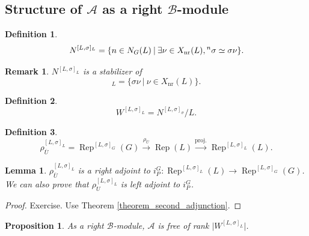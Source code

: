 \documentclass[8pt]{article}
\newtheorem{proposition}{Proposition}[section]
\newtheorem{definition}{Definition}[section]
\newtheorem{lemma}{Lemma}[section]
\newtheorem{remark}{Remark}[section]
\DeclareMathOperator{\Rep}{Rep}
\DeclareMathOperator{\nr}{nr}
\newcommand{\sep}[0]{\:|\:}
\newcommand{\cA}{\mathcal{A}}
\newcommand{\cB}{\mathcal{B}}
\begin{document}
  \subsection{Structure of $\cA$ as a right $\cB$-module}
  \begin{definition}
    \begin{equation*}
      N^{[L,\sigma]_L}=\{n\in N_G(L)\sep \exists \nu\in X_{\nr}(L),\prescript{n}{}{\sigma}\simeq \sigma\nu\}.
    \end{equation*}
  \end{definition}
  \begin{remark}
    $N^{[L,\sigma]_L}$ is a stabilizer of 
    \begin{equation*}
      [L,\sigma]_L=\{\sigma\nu\sep \nu\in X_{\nr}(L)\}.
    \end{equation*}
  \end{remark}
  \begin{definition}
    \begin{equation*}
      W^{[L,\sigma]_L} = N^{[L,\sigma]_\sigma}/L.
    \end{equation*}
  \end{definition}
  \begin{definition}
    \begin{equation*}
      \rho_{\overline{U}}^{[L,\sigma]_L}=\Rep^{[L,\sigma]_G}(G)\stackrel{\rho_{\overline{U}}}{\to}\Rep(L)\stackrel{\text{proj.}}{\to}\Rep^{[L,\sigma]_L}(L).
    \end{equation*}
  \end{definition}
  \begin{lemma}
    \label{lemma_101}
    $\rho_{\overline{U}}^{[L,\sigma]_L}$ is a right adjoint to $i_P^G:\Rep^{[L,\sigma]_L}(L)\to\Rep^{[L,\sigma]_G}(G)$. We can also prove that $\rho_U^{[L,\sigma]_L}$ is left adjoint to $i_P^G$.
  \end{lemma}
  \begin{proof}
    Exercise. Use Theorem \ref{theorem_second_adjunction}.
  \end{proof}
  \begin{proposition}
    \label{proposition_102}
    As a right $\cB$-module, $\cA$ is free of rank $\vert W^{[L,\sigma]_L}\vert$. 
  \end{proposition}
\end{document}

